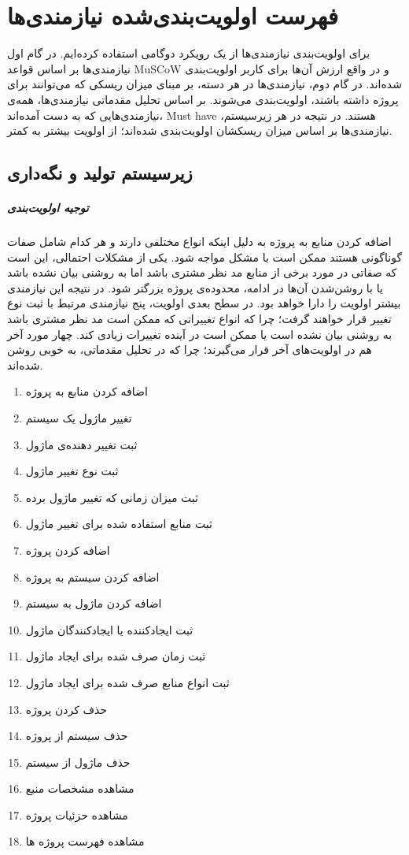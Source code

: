 
\chapter{فهرست اولویت‌بندی‌شده نیازمندی‌ها}
برای اولویت‌بندی نیازمندی‌ها از یک رویکرد دوگامی استفاده کرده‌ایم. در گام اول نیازمندی‌ها بر اساس قواعد MuSCoW و در واقع ارزش آن‌ها برای کاربر اولویت‌بندی شده‌اند. در گام دوم، نیازمندی‌ها در هر دسته، بر مبنای میزان ریسکی که می‌توانند برای پروژه داشته باشند، اولویت‌بندی می‌شوند. بر اساس تحلیل مقدماتی نیازمندی‌ها، همه‌ی نیازمندی‌هایی که به دست آمده‌اند، Must have هستند. در نتیجه در هر زیرسیستم، نیازمندی‌ها بر اساس میزان ریسکشان اولویت‌بندی شده‌اند؛ از اولویت بیشتر به کمتر. \\

\section{زیرسیستم تولید و نگه‌داری}
\paragraph{توجیه اولویت‌بندی}
اضافه کردن منابع به پروژه به دلیل اینکه انواع مختلفی دارند و هر کدام شامل صفات گوناگونی هستند ممکن است با مشکل مواجه شود. یکی از مشکلات احتمالی، این است که صفاتی در مورد برخی از منابع مد نظر مشتری باشد اما به روشنی بیان نشده باشد یا با روشن‌شدن آن‌ها در ادامه، محدوده‌ی پروژه بزرگتر شود. در نتیجه این نیازمندی بیشتر اولویت را دارا خواهد بود. در سطح بعدی اولویت، پنج نیازمندی مرتبط با ثبت نوع تغییر قرار خواهند گرفت؛ چرا که انواع تغییراتی که ممکن است مد نظر مشتری باشد به روشنی بیان نشده است یا ممکن است در آینده تغییرات زیادی کند. چهار مورد آخر هم در اولویت‌های آخر قرار می‌گیرند؛ چرا که در تحلیل مقدماتی، به خوبی روشن شده‌اند.
\begin{enumerate}
	\item اضافه کردن منابع به پروژه
	\item تغییر ماژول یک سیستم
	\item ثبت تغییر دهنده‌ی ماژول
	\item ثبت نوع تغییر ماژول
	\item ثبت میزان زمانی که تغییر ماژول برده
	\item ثبت منابع استفاده شده برای تغییر ماژول
	\item اضافه کردن پروژه
	\item اضافه کردن سیستم به پروژه
	\item اضافه کردن ماژول به سیستم
	\item ثبت ایجادکننده یا ایجادکنندگان ماژول
	\item ثبت زمان صرف شده برای ایجاد ماژول
	\item ثبت انواع منابع صرف شده برای ایجاد ماژول
	\item حذف کردن پروژه
	\item حذف سیستم از پروژه
	\item حذف ماژول از سیستم
	\item مشاهده مشخصات منبع
	\item مشاهده حزئیات پروژه
	\item  مشاهده فهرست پروژه ها
\end{enumerate}
